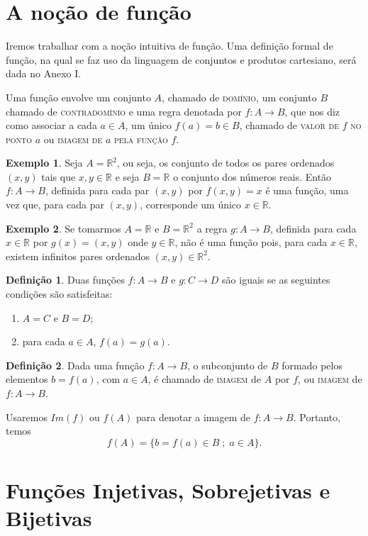 \documentclass[a4paper,12pt]{monografia}
\theoremstyle{plain}
\theoremstyle{definition}
\newtheorem{definition}{Definição}[section]
\newtheorem{example}{Exemplo}[section]
\theoremstyle{remark}
\newcommand{\R}{\mathbb{R}}
\begin{document}
\section{A noção de função}
\indent\indent Iremos trabalhar com a noção intuitiva de função.
Uma definição formal de função, na qual se faz uso da linguagem de
conjuntos e produtos cartesiano, será dada no Anexo I.

Uma função envolve um conjunto $A$, chamado de \textsc{domínio},
um conjunto $B$ chamado de \textsc{contradomínio} e uma regra
denotada por $f:A \rightarrow B$, que nos diz como associar a cada
$a \in A$, um único $f(a)=b \in B$, chamado de \textsc{valor de}
$f$ \textsc{no ponto} $a$ ou \textsc{imagem de} $a$ \textsc{pela
função} $f$.
\begin{example}\label{R2emR}
Seja $A=\R^2$, ou seja, os conjunto de todos os pares ordenados
$(x,y)$ tais que $x,y \in \R$ e seja $B=\R$ o conjunto dos números
reais. Então $f:A \rightarrow B$, definida para cada par $(x,y)$
por $f(x,y)=x$ é uma função, uma vez que, para cada par $(x,y)$,
corresponde um único $x \in \R$.
\end{example}
\begin{example}
Se tomarmos $A=\R$ e $B=\R^2$ a regra $g:A \rightarrow B$,
definida para cada $x \in \R$ por $g(x)=(x,y)$ onde $y \in \R$,
não é uma função pois, para cada $x \in \R$, existem infinitos
pares ordenados $(x,y) \in \R^2$.
\end{example}

\begin{definition}
Duas funções $f:A \rightarrow B$ e $g:C \rightarrow D$ são iguais
se as seguintes condições são satisfeitas:
\begin{enumerate}
    \item $A=C$ e $B=D$;
    \item para cada $a \in A$, $f(a)=g(a)$.
\end{enumerate}
\end{definition}
\begin{definition}
Dada uma função $f:A \rightarrow B$, o subconjunto de $B$ formado
pelos elementos $b=f(a)$, com $a \in A$, é chamado de
\textsc{imagem} de $A$ por $f$, ou \textsc{imagem} de $f:A
\rightarrow B$.
\end{definition}
Usaremos $Im(f)$ ou $f(A)$ para denotar a imagem de $f:A
\rightarrow B$. Portanto, temos
$$
f(A)=\{b=f(a)\in B\;;\; a \in A\}.
$$

\section{Funções Injetivas, Sobrejetivas e Bijetivas}
\end{document}
